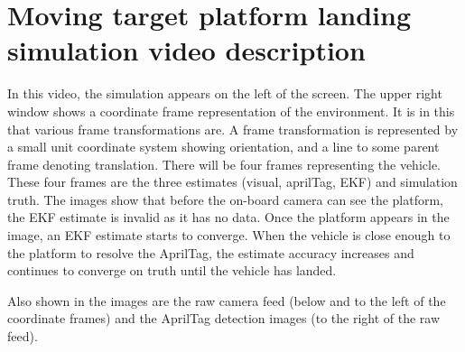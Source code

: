 \chapter{Moving target platform landing simulation video description}
In this video, the simulation appears on the left of the screen. The upper right window shows a coordinate
frame representation of the environment. It is in this that various frame transformations are. A
frame transformation is represented by a small unit coordinate system showing orientation, and a line to some
parent frame denoting translation. There will be four frames representing the vehicle. These four frames are
the three estimates (visual, aprilTag, EKF) and simulation truth. The images show that before the on-board
camera can see the platform, the EKF estimate is invalid as it has no data. Once the platform appears in the
image, an EKF estimate starts to converge. When the vehicle is close enough to the platform to resolve the
AprilTag, the estimate accuracy increases and continues to converge on truth until the vehicle has landed.

Also shown in the images are the raw camera feed (below and to the left of the coordinate frames) and the
AprilTag detection images (to the right of the raw feed).


